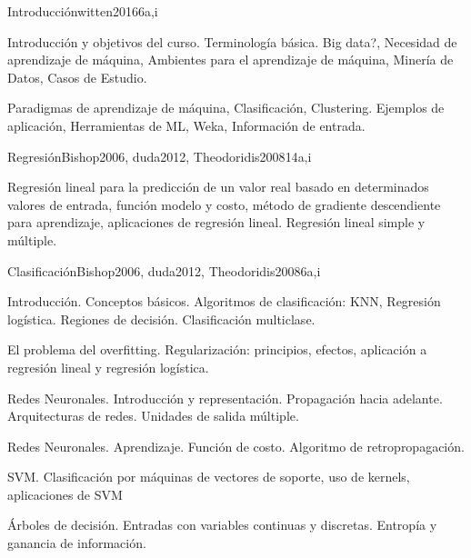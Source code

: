 \begin{syllabus}
\begin{competences}
    \item {}
\end{competences}

\begin{unit}{Introducción}{}{witten2016}{6}{a,i}
\begin{topics}
      \item Introducción y objetivos del curso. Terminología básica. Big data?, Necesidad de aprendizaje de máquina, Ambientes para el aprendizaje de máquina, Minería de Datos, Casos de Estudio. 
      \item Paradigmas de aprendizaje de máquina, Clasificación, Clustering. Ejemplos de aplicación, Herramientas de ML, Weka, Información de entrada.
   \end{topics}

\end{unit}

\begin{unit}{Regresión}{}{Bishop2006, duda2012, Theodoridis2008}{14}{a,i}
\begin{topics}
      \item Regresión lineal para la predicción de un valor real basado en determinados valores de entrada, función modelo y costo, método de gradiente descendiente para aprendizaje, aplicaciones de regresión lineal. Regresión lineal simple y múltiple.
    \end{topics}

\end{unit}

\begin{unit}{Clasificación}{}{Bishop2006, duda2012, Theodoridis2008}{6}{a,i}
\begin{topics}
      \item Introducción. Conceptos básicos. Algoritmos de clasificación: KNN, Regresión logística. Regiones de decisión. Clasificación multiclase.
      \item El problema del overfitting. Regularización: principios, efectos, aplicación a regresión lineal y regresión logística.
      \item Redes Neuronales. Introducción y representación. Propagación hacia adelante. Arquitecturas de redes. Unidades de salida múltiple.
      \item Redes Neuronales. Aprendizaje. Función de costo. Algoritmo de retropropagación.
      \item SVM. Clasificación por máquinas de vectores de soporte, uso de kernels, aplicaciones de SVM
      \item Árboles de decisión. Entradas con variables continuas y discretas. Entropía y ganancia de información.


\end{topics}
\end{unit}
\end{syllabus}
